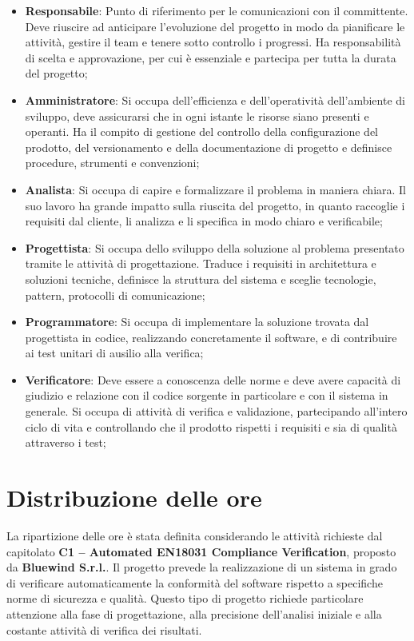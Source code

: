 \documentclass[a4paper,12pt]{article}
\begin{document}
        \begin{itemize}
            \item \textbf{Responsabile}: Punto di riferimento per le comunicazioni con il committente. Deve riuscire ad anticipare l'evoluzione del progetto in modo da pianificare le attività, gestire il team e tenere sotto controllo i progressi. Ha responsabilità di scelta e approvazione, per cui è essenziale e partecipa per tutta la durata del progetto;
            \item \textbf{Amministratore}: Si occupa dell'efficienza e dell'operatività dell'ambiente di sviluppo, deve assicurarsi che in ogni istante le risorse siano presenti e operanti. Ha il compito di gestione del controllo della configurazione del prodotto, del versionamento e della documentazione di progetto e definisce procedure, strumenti e convenzioni;
            \item \textbf{Analista}: Si occupa di capire e formalizzare il problema in maniera chiara. Il suo lavoro ha grande impatto sulla riuscita del progetto, in quanto raccoglie i requisiti dal cliente, li analizza e li specifica in modo chiaro e verificabile;
            \item \textbf{Progettista}: Si occupa dello sviluppo della soluzione al problema presentato tramite le attività di progettazione. Traduce i requisiti in architettura e soluzioni tecniche, definisce la struttura del sistema e sceglie tecnologie, pattern, protocolli di comunicazione;
            \item \textbf{Programmatore}: Si occupa di implementare la soluzione trovata dal progettista in codice, realizzando concretamente il software, e di contribuire ai test unitari di ausilio alla verifica;
            \item \textbf{Verificatore}: Deve essere a conoscenza delle norme e deve avere capacità di giudizio e relazione con il codice sorgente in particolare e con il sistema in generale. Si occupa di attività di verifica e validazione, partecipando all'intero ciclo di vita e controllando che il prodotto rispetti i requisiti e sia di qualità attraverso i test;
        \end{itemize}

\section{Distribuzione delle ore}
La ripartizione delle ore è stata definita considerando le attività richieste dal capitolato \textbf{C1 – Automated EN18031 Compliance Verification}, proposto da \textbf{Bluewind S.r.l.}.  
Il progetto prevede la realizzazione di un sistema in grado di verificare automaticamente la conformità del software rispetto a specifiche norme di sicurezza e qualità. Questo tipo di progetto richiede particolare attenzione alla fase di progettazione, alla precisione dell’analisi iniziale e alla costante attività di verifica dei risultati.
\end{document}
